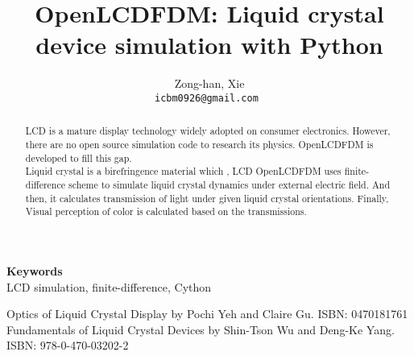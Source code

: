 \documentclass[a4paper]{article} %
\date{} %
\def\keywords#1{\begin{center}{\bf Keywords}\\{#1}\end{center}} %
\def\titulo#1{\title{#1}} %
\def\autores#1{\author{#1}} %
\begin{document}
\titulo{OpenLCDFDM: Liquid crystal device simulation with Python}

\autores{Zong-han, Xie \\
       \tt{icbm0926@gmail.com} %
       }%

\maketitle

\thispagestyle{empty}



\begin{abstract}
LCD is a mature display technology widely adopted on consumer electronics. However, there are no open source simulation code to research its physics. OpenLCDFDM is developed to fill this gap. \\
Liquid crystal is a birefringence material which , LCD OpenLCDFDM uses finite-difference scheme to simulate liquid crystal dynamics under external electric field. And then, it calculates transmission of light under given liquid crystal orientations. Finally, Visual perception of color is calculated based on the transmissions.

\end{abstract}

\keywords{LCD simulation, finite-difference, Cython} %



\begin{thebibliography}{9}
Optics of Liquid Crystal Display by Pochi Yeh and Claire Gu. ISBN: 0470181761
Fundamentals of Liquid Crystal Devices by Shin-Tson Wu and Deng-Ke Yang. ISBN: 978-0-470-03202-2
\end{thebibliography}
\end{document}

